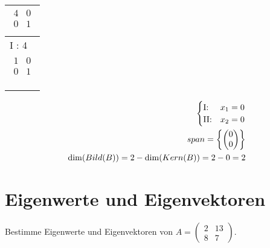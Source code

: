 \begin{longtable}{p{10cm}}
    $\displaystyle\begin{matrix}
                          4 & 0 \\
                          0 & 1 \\
                      \end{matrix}$                                                            \\\hline
    I : 4                                                                                  \\\hline\pagebreak[0]

    $\displaystyle\begin{matrix}
                          1 & 0 \\
                          0 & 1 \\
                      \end{matrix}$                                                            \\\hline
    \\\hline\pagebreak[0]

\end{longtable}

\begin{align*}
    \begin{cases}
        \text{I:\@}  & x_1 = 0 \\
        \text{II:\@} & x_2 = 0
    \end{cases}              \\
    span = \left\{\begin{pmatrix}
                      0 \\ 0
                  \end{pmatrix}\right\} \\
    \dim(Bild(B)) = 2 - \dim(Kern(B)) = 2 - 0 = 2
\end{align*}

\section{Eigenwerte und Eigenvektoren}

Bestimme Eigenwerte und Eigenvektoren von $A = \begin{pmatrix}
        2 & 13 \\
        8 & 7
    \end{pmatrix}$.

